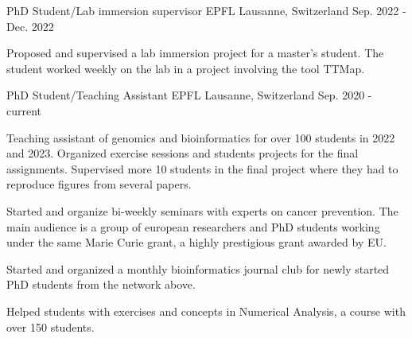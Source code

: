 

\begin{cventries}
  \cventry
    {PhD Student/Lab immersion supervisor} %
    {EPFL} %
    {Lausanne, Switzerland} %
    {Sep. 2022 - Dec. 2022} %
    {
      \begin{cvitems} %
          \item Proposed and supervised a lab immersion project for a 
                master's student. The student worked weekly on the lab in a 
                project involving the tool TTMap.
      \end{cvitems}
    }
 
 \cventry
    {PhD Student/Teaching Assistant} %
    {EPFL} %
    {Lausanne, Switzerland} %
    {Sep. 2020 - current} %
    {
      \begin{cvitems} %
          \item Teaching assistant of genomics and bioinformatics for over 100 
                students in 2022 and 2023. Organized exercise sessions and 
                students projects for the final assignments. Supervised more
                10 students in the final project where they had to reproduce
                figures from several papers.
          \item Started and organize bi-weekly seminars with experts on cancer
                prevention. The main audience is a group of european 
                researchers and PhD students working under the same Marie Curie
                grant, a highly prestigious grant awarded by EU.  
          \item Started and organized a monthly bioinformatics journal club for
                newly started PhD students from the network above.
          \item Helped students with exercises and concepts in 
                Numerical Analysis, a course with over 150 students.
      \end{cvitems}
    }


\end{cventries}
